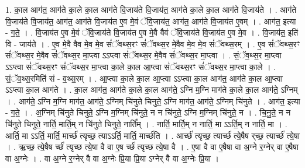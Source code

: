 \documentclass[17pt]{extarticle}
\begin{document}
1. का॒ल आग॑त॒ आग॑ते का॒ले का॒ल आग॑ते वि॒जाय॑ते वि॒जाय॑त॒ आग॑ते का॒ले का॒ल आग॑ते वि॒जाय॑ते । . आग॑ते वि॒जाय॑ते वि॒जाय॑त॒ आग॑त॒ आग॑ते वि॒जाय॑त ए॒व मे॒वं ॅवि॒जाय॑त॒ आग॑त॒ आग॑ते वि॒जाय॑त ए॒वम् । . आग॑त॒ इत्या - ग॒ते॒ । . वि॒जाय॑त ए॒व मे॒वं ॅवि॒जाय॑ते वि॒जाय॑त ए॒व मे॒वै वैवं ॅवि॒जाय॑ते वि॒जाय॑त ए॒व मे॒व । . वि॒जाय॑त॒ इति॑ वि - जाय॑ते । . ए॒व मे॒वै वैव मे॒व मे॒व सं॑ॅवथ्स॒रꣳ सं॑ॅवथ्स॒र मे॒वैव मे॒व मे॒व सं॑ॅवथ्स॒रम् । . ए॒व सं॑ॅवथ्स॒रꣳ सं॑ॅवथ्स॒र मे॒वैव सं॑ॅवथ्स॒र मा॒प्त्वा ऽऽप्त्वा सं॑ॅवथ्स॒र मे॒वैव सं॑ॅवथ्स॒र मा॒प्त्वा । . सं॒ॅव॒थ्स॒र मा॒प्त्वा ऽऽप्त्वा सं॑ॅवथ्स॒रꣳ सं॑ॅवथ्स॒र मा॒प्त्वा का॒ले का॒ल आ॒प्त्वा सं॑ॅवथ्स॒रꣳ सं॑ॅवथ्स॒र मा॒प्त्वा का॒ले । . सं॒ॅव॒थ्स॒रमिति॑ सं - व॒थ्स॒रम् । . आ॒प्त्वा का॒ले का॒ल आ॒प्त्वा ऽऽप्त्वा का॒ल आग॑त॒ आग॑ते का॒ल आ॒प्त्वा ऽऽप्त्वा का॒ल आग॑ते । . का॒ल आग॑त॒ आग॑ते का॒ले का॒ल आग॑ते॒ ऽग्नि म॒ग्नि माग॑ते का॒ले का॒ल आग॑ते॒ ऽग्निम् । . आग॑ते॒ ऽग्नि म॒ग्नि माग॑त॒ आग॑ते॒ ऽग्निम् चि॑नुते चिनुते॒ ऽग्नि माग॑त॒ आग॑ते॒ ऽग्निम् चि॑नुते । . आग॑त॒ इत्या - ग॒ते॒ । . अ॒ग्निम् चि॑नुते चिनुते॒ ऽग्नि म॒ग्निम् चि॑नुते॒ न न चि॑नुते॒ ऽग्नि म॒ग्निम् चि॑नुते॒ न । . चि॒नु॒ते॒ न न चि॑नुते चिनुते॒ नार्ति॒ मार्ति॒म् न चि॑नुते चिनुते॒ नार्ति᳚म् । . नार्ति॒ मार्ति॒म् न नार्ति॒ मा ऽऽर्ति॒म् न नार्ति॒ मा । . आर्ति॒ मा ऽऽर्ति॒ मार्ति॒ मार्च्छ॑ त्यृच्छ॒ त्याऽऽर्ति॒ मार्ति॒ मार्च्छ॑ति । . आर्च्छ॑ त्यृच्छ॒ त्यार्च्छ॑ त्ये॒षैष र्‌च्छ॒ त्यार्च्छ॑ त्ये॒षा । . ऋ॒च्छ॒ त्ये॒षैष र्च्छ॑ त्यृच्छ त्ये॒षा वै वा ए॒ष र्च्छ॑ त्यृच्छ त्ये॒षा वै । . ए॒षा वै वा ए॒षैषा वा अ॒ग्ने र॒ग्नेर् वा ए॒षैषा वा अ॒ग्नेः । . वा अ॒ग्ने र॒ग्नेर् वै वा अ॒ग्नेः प्रि॒या प्रि॒या ऽग्नेर् वै वा अ॒ग्नेः प्रि॒या । \newline
\end{document}
